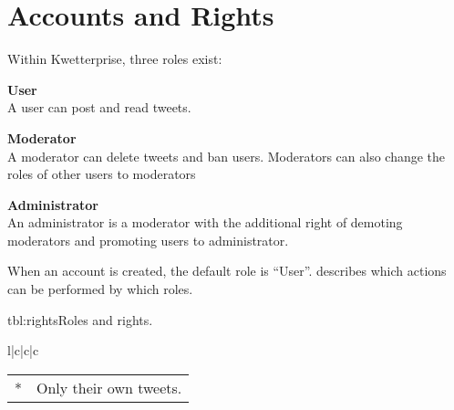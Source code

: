 \chapter{Accounts and Rights}
Within Kwetterprise, three roles exist:
\begin{teenumerate}
    \item \textbf{User}\\
    A user can post and read tweets.
    \item \textbf{Moderator}\\
    A moderator can delete tweets and ban users. Moderators can also change the roles of other users to moderators
    \item \textbf{Administrator}\\
    An administrator is a moderator with the additional right of demoting moderators and promoting users to administrator.
\end{teenumerate}

When an account is created, the default role is ``User''.  describes which actions can be performed by which roles.

\begin{tetable}{tbl:rights}{Roles and rights.}
    \begin{tetabular}{l|c|c|c}
    \end{tetabular}
\end{tetable}
{\footnotesize
\begin{tabular}{l@{}l}
    * & Only their own tweets.\\
\end{tabular}}